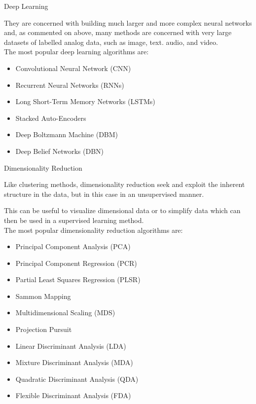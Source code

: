\documentclass{beamer}
\begin{document}
\begin{frame}{Deep Learning}
\begin{flushleft}
	They are concerned with building much larger and more complex neural networks and, as commented on above, many methods are concerned with very large datasets of labelled analog data, such as image, text. audio, and video.
\\
\vspace{10pt}
The most popular deep learning algorithms are:

\begin{itemize}
	\item Convolutional Neural Network (CNN)
\item Recurrent Neural Networks (RNNs)
\item Long Short-Term Memory Networks (LSTMs)
\item Stacked Auto-Encoders
\item Deep Boltzmann Machine (DBM)
\item Deep Belief Networks (DBN)
\end{itemize}

	\end{flushleft}
\end{frame}
\begin{frame}{Dimensionality Reduction}
\begin{flushleft}
	Like clustering methods, dimensionality reduction seek and exploit the inherent structure in the data, but in this case in an unsupervised manner.

This can be useful to visualize dimensional data or to simplify data which can then be used in a supervised learning method.
\\
\vspace{10pt}
The most popular dimensionality reduction algorithms are:

\begin{itemize}
	\item Principal Component Analysis (PCA)
\item Principal Component Regression (PCR)
\item Partial Least Squares Regression (PLSR)
\item Sammon Mapping
\item Multidimensional Scaling (MDS)
\item Projection Pursuit
\item Linear Discriminant Analysis (LDA)
\item Mixture Discriminant Analysis (MDA)
\item Quadratic Discriminant Analysis (QDA)
\item Flexible Discriminant Analysis (FDA)
\end{itemize}

	\end{flushleft}
\end{frame}
\end{document}
